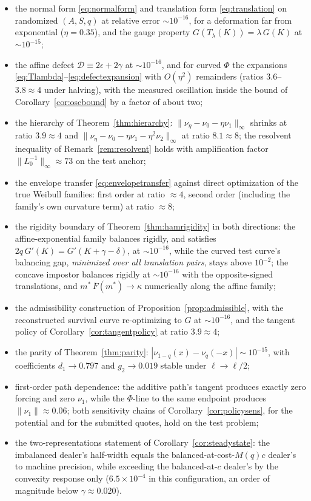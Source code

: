 \documentclass[11pt]{article}
\newcommand{\Fbar}{\bar F}
\begin{document}
\begin{itemize}
\item the normal form \eqref{eq:normalform} and translation form \eqref{eq:translation} on randomized $(A, S, q)$ at relative error $\sim 10^{-16}$, for a deformation far from exponential ($\eta = 0.35$), and the gauge property $G(T_\lambda(K)) = \lambda\,G(K)$ at $\sim 10^{-15}$;
\item the affine defect $\mathcal D \equiv 2\epsilon + 2\gamma$ at $\sim 10^{-16}$, and for curved $\Phi$ the expansions \eqref{eq:Tlambda}--\eqref{eq:defectexpansion} with $O(\eta^2)$ remainders (ratios $3.6$--$3.8 \approx 4$ under halving), with the measured oscillation inside the bound of Corollary~\ref{cor:oscbound} by a factor of about two;
\item the hierarchy of Theorem~\ref{thm:hierarchy}: $\|\nu_\eta - \nu_0 - \eta\nu_1\|_\infty$ shrinks at ratio $3.9 \approx 4$ and $\|\nu_\eta - \nu_0 - \eta\nu_1 - \eta^2\nu_2\|_\infty$ at ratio $8.1 \approx 8$; the resolvent inequality of Remark~\ref{rem:resolvent} holds with amplification factor $\|L_0^{-1}\|_\infty \approx 73$ on the test anchor;
\item the envelope transfer \eqref{eq:envelopetransfer} against direct optimization of the true Weibull families: first order at ratio $\approx 4$, second order (including the family's own curvature term) at ratio $\approx 8$;
\item the rigidity boundary of Theorem~\ref{thm:hamrigidity} in both directions: the affine-exponential family balances rigidly, and satisfies $2q\,G'(K) = G'(K + \gamma - \delta)$, at $\sim 10^{-16}$, while the curved test curve's balancing gap, \emph{minimized over all translation pairs}, stays above $10^{-2}$; the concave impostor balances rigidly at $\sim 10^{-16}$ with the opposite-signed translations, and $m^\ast\,\Fbar(m^\ast) \to \kappa$ numerically along the affine family;
\item the admissibility construction of Proposition~\ref{prop:admissible}, with the reconstructed survival curve re-optimizing to $G$ at $\sim 10^{-16}$, and the tangent policy of Corollary~\ref{cor:tangentpolicy} at ratio $3.9 \approx 4$;
\item the parity of Theorem~\ref{thm:parity}: $|\nu_{1-q}(x) - \nu_q(-x)| \sim 10^{-15}$, with coefficients $d_1 \to 0.797$ and $g_2 \to 0.019$ stable under $\ell \to \ell/2$;
\item first-order path dependence: the additive path's tangent produces exactly zero forcing and zero $\nu_1$, while the $\Phi$-line to the same endpoint produces $\|\nu_1\| \approx 0.06$; both sensitivity chains of Corollary~\ref{cor:policysens}, for the potential and for the submitted quotes, hold on the test problem;
\item the two-representations statement of Corollary~\ref{cor:steadystate}: the imbalanced dealer's half-width equals the balanced-at-cost-$M(q)c$ dealer's to machine precision, while exceeding the balanced-at-$c$ dealer's by the convexity response only ($6.5 \times 10^{-4}$ in this configuration, an order of magnitude below $\gamma \approx 0.020$).
\end{itemize}
\end{document}
